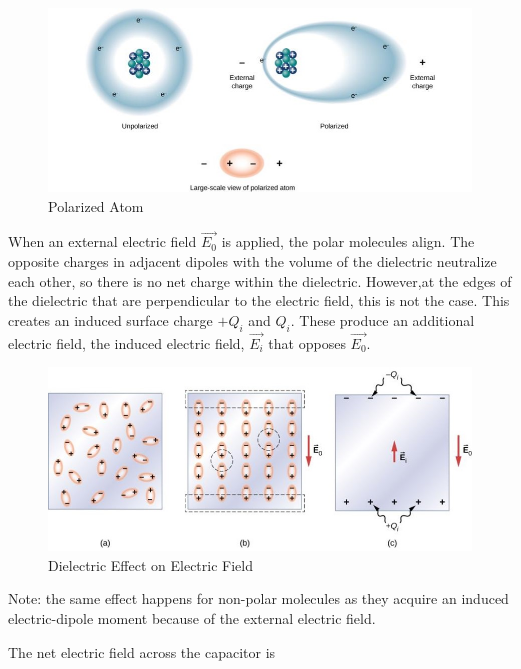 \documentclass[14pt]{memoir}
\begin{document}
\begin{figure}[H]
\begin{center}
\includegraphics[scale=0.50]{fig/fig_08_19.jpg}
\caption{Polarized Atom}
\label{fig:08_19}
\end{center}
\end{figure}

When an external electric field $\vec{E_0}$ is applied, the polar molecules align. The opposite charges in adjacent dipoles with the volume of the dielectric neutralize each other, so there is no net charge within the dielectric. However,at the edges of the dielectric that are perpendicular to the electric field, this is not the case. This creates an induced surface charge $+Q_i$ and $Q_i$. These produce an additional electric field, the induced electric field, $\vec{E_i}$ that opposes $\vec{E_0}$.

\begin{figure}[H]
\begin{center}
\includegraphics[scale=0.50]{fig/fig_08_20.jpg}
\caption{Dielectric Effect on Electric Field}
\label{fig:08_20}
\end{center}
\end{figure}

Note: the same effect happens for non-polar molecules as they acquire an induced electric-dipole moment because of the external electric field. 

The net electric field across the capacitor is 
\end{document}
